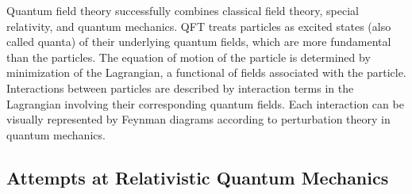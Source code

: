 Quantum field theory successfully combines classical field theory, special relativity, and quantum mechanics. QFT treats particles as excited states (also called quanta) of their underlying quantum fields, which are more fundamental than the particles. The equation of motion of the particle is determined by minimization of the Lagrangian, a functional of fields associated with the particle. Interactions between particles are described by interaction terms in the Lagrangian involving their corresponding quantum fields. Each interaction can be visually represented by Feynman diagrams according to perturbation theory in quantum mechanics.

\subsection{Attempts at Relativistic Quantum Mechanics}
\label{sec:attempts-rqt}

